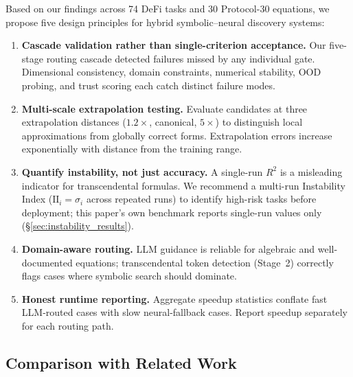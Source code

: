 \documentclass[twoside,11pt]{article}
\newcommand{\Rsq}{R^{2}}
\newcommand{\II}{\mathrm{II}}
\begin{document}
Based on our findings across 74 DeFi tasks and 30 Protocol-30 equations, we propose five design principles for hybrid symbolic--neural discovery systems:

\begin{enumerate}
  \item \textbf{Cascade validation rather than single-criterion acceptance.} Our five-stage routing cascade detected failures missed by any individual gate. Dimensional consistency, domain constraints, numerical stability, OOD probing, and trust scoring each catch distinct failure modes.
  \item \textbf{Multi-scale extrapolation testing.} Evaluate candidates at three extrapolation distances ($1.2\times$, canonical, $5\times$) to distinguish local approximations from globally correct forms. Extrapolation errors increase exponentially with distance from the training range.
  \item \textbf{Quantify instability, not just accuracy.} A single-run $\Rsq$ is a misleading indicator for transcendental formulas. We recommend a multi-run Instability Index ($\II_i = \sigma_i$ across repeated runs) to identify high-risk tasks before deployment; this paper's own benchmark reports single-run values only (\S\ref{sec:instability_results}).
  \item \textbf{Domain-aware routing.} LLM guidance is reliable for algebraic and well-documented equations; transcendental token detection (Stage~2) correctly flags cases where symbolic search should dominate.
  \item \textbf{Honest runtime reporting.} Aggregate speedup statistics conflate fast LLM-routed cases with slow neural-fallback cases. Report speedup separately for each routing path.
\end{enumerate}

\subsection{Comparison with Related Work}\label{subsec:comparison-with-related-work}
\label{sec:disc_related}
\end{document}
